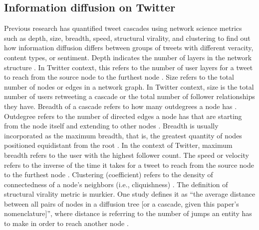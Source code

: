 \documentclass[11pt,a4paper]{article}
\begin{document}
    \subsection{Information diffusion on Twitter}
    Previous research has quantified tweet cascades using network science metrics such as depth, size, breadth, speed, structural virality, and clustering to find out how information diffusion differs between groups of tweets with different veracity, content types, or sentiment. Depth indicates the number of layers in the network structure \cite{goel_structural_2016}. In Twitter context, this refers to the number of user layers for a tweet to reach from the source node to the furthest node \cite{juul_comparing_2021}. Size refers to the total number of nodes or edges in a network graph. In Twitter context, size is the total number of users retweeting a cascade or the total number of follower relationships they have. Breadth of a cascade refers to how many outdegrees a node has \cite{juul_comparing_2021}. Outdegree refers to the number of directed edges a node has that are starting from the node itself and extending to other nodes \cite{hagberg_exploring_2008}. Breadth is usually incorporated as the maximum breadth, that is, the greatest quantity of nodes positioned equidistant from the root \cite{juul_comparing_2021}. In the context of Twitter, maximum breadth refers to the user with the highest follower count. The speed or velocity refers to the inverse of the time it takes for a tweet to reach from the source node to the furthest node \cite{juul_comparing_2021}. Clustering (coefficient) refers to the density of connectedness of a node's neighbors (i.e., cliquishness) \cite{watts_collective_1998}. The definition of structural virality metric is murkier. One study defines it as \enquote{the average distance between all pairs of nodes in a diffusion tree [or a cascade, given this paper's nomenclature]}, where distance is referring to the number of jumps an entity has to make in order to reach another node \cite{goel_structural_2016}.
    
\end{document}
